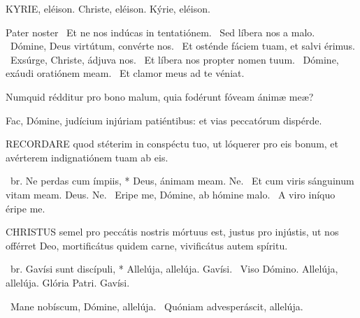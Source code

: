 
KYRIE, eléison. Christe, eléison. Kýrie, eléison.

Pater noster  \V\ Et ne nos indúcas in tentatiónem. \R\ Sed líbera nos a malo. \V\ Dómine, Deus virtútum, convérte nos. \R\ Et osténde fáciem tuam, et salvi érimus. \V\ Exsúrge, Christe, ádjuva nos. \R\ Et líbera nos propter nomen tuum. \V\ Dómine, exáudi oratiónem meam. \R\ Et clamor meus ad te véniat.




 Numquid rédditur pro bono malum, quia fodérunt fóveam ánimæ meæ?


 Fac, Dómine, judícium injúriam patiéntibus: et vias peccatórum dispérde.


\lettrine[lines=2]{R}{ECORDARE} quod stéterim in conspéctu tuo, ut lóquerer pro eis bonum, et avérterem indignatiónem tuam ab eis.

\R\ br. Ne perdas cum ímpiis, * Deus, ánimam meam. Ne. \V\ Et cum viris sánguinum vitam meam. Deus. Ne. \V\ Eripe me, Dómine, ab hómine malo. \R\ A viro iníquo éripe me.





\lettrine[lines=2]{C}{HRISTUS} semel pro peccátis nostris mórtuus est, justus pro injústis, ut nos offérret Deo, mortificátus quidem carne, vivificátus autem spíritu.

\R\ br. Gavísi sunt discípuli, * Allelúja, allelúja. Gavísi. \V\ Viso Dómino. Allelúja, allelúja. Glória Patri. Gavísi.

\V\ Mane nobíscum, Dómine, allelúja. \R\ Quóniam advesperáscit, allelúja.


\sectionornament


